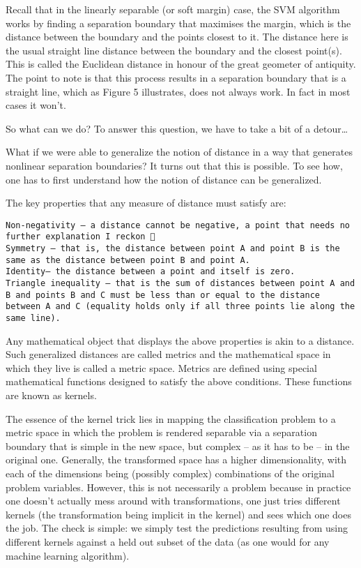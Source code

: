 \documentclass[]{book}
\begin{document}
Recall that in the linearly separable (or soft margin) case, the SVM algorithm works by finding a separation boundary that maximises the margin, which is the distance between the boundary and the points closest to it. The distance here is the usual straight line distance between the boundary and the closest point(s). This is called the Euclidean distance in honour of the great geometer of antiquity. The point to note is that this process results in a separation boundary that is a straight line, which as Figure 5 illustrates, does not always work. In fact in most cases it won't.

So what can we do? To answer this question, we have to take a bit of a detour\ldots{}

What if we were able to generalize the notion of distance in a way that generates nonlinear separation boundaries? It turns out that this is possible. To see how, one has to first understand how the notion of distance can be generalized.

The key properties that any measure of distance must satisfy are:

\begin{verbatim}
Non-negativity – a distance cannot be negative, a point that needs no further explanation I reckon 🙂
Symmetry – that is, the distance between point A and point B is the same as the distance between point B and point A.
Identity– the distance between a point and itself is zero.
Triangle inequality – that is the sum of distances between point A and B and points B and C must be less than or equal to the distance between A and C (equality holds only if all three points lie along the same line).
\end{verbatim}

Any mathematical object that displays the above properties is akin to a distance. Such generalized distances are called metrics and the mathematical space in which they live is called a metric space. Metrics are defined using special mathematical functions designed to satisfy the above conditions. These functions are known as kernels.

The essence of the kernel trick lies in mapping the classification problem to a metric space in which the problem is rendered separable via a separation boundary that is simple in the new space, but complex -- as it has to be -- in the original one. Generally, the transformed space has a higher dimensionality, with each of the dimensions being (possibly complex) combinations of the original problem variables. However, this is not necessarily a problem because in practice one doesn't actually mess around with transformations, one just tries different kernels (the transformation being implicit in the kernel) and sees which one does the job. The check is simple: we simply test the predictions resulting from using different kernels against a held out subset of the data (as one would for any machine learning algorithm).
\end{document}
